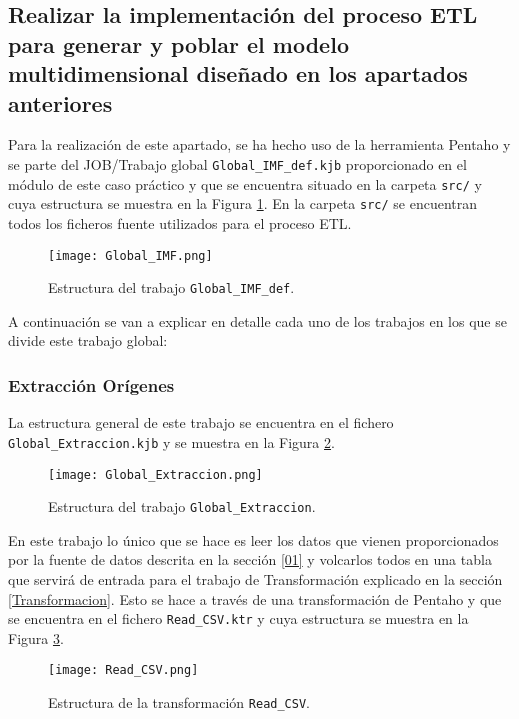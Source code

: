\medskip
\subsection{Realizar la implementación del proceso ETL para generar y poblar el modelo multidimensional diseñado en los apartados anteriores}
Para la realización de este apartado, se ha hecho uso de la herramienta Pentaho y se parte del JOB/Trabajo global \texttt{Global\_IMF\_def.kjb} proporcionado en el módulo de este caso práctico y que se encuentra situado en la carpeta \texttt{src/} y cuya estructura se muestra en la Figura \ref{Global_IMF}. En la carpeta \texttt{src/} se encuentran todos los ficheros fuente utilizados para el proceso ETL.

\begin{figure}[!th]
\texttt{[image: Global\_IMF.png]}
\centering
\caption{Estructura del trabajo \texttt{Global\_IMF\_def}.}
\label{Global_IMF}
\end{figure}

A continuación se van a explicar en detalle cada uno de los trabajos en los que se divide este trabajo global:


\medskip
\subsubsection{Extracción Orígenes}
La estructura general de este trabajo se encuentra en el fichero \texttt{Global\_Extraccion.kjb} y se muestra en la Figura \ref{Global_Extraccion}.

\begin{figure}[!th]
\texttt{[image: Global\_Extraccion.png]}
\centering
\caption{Estructura del trabajo \texttt{Global\_Extraccion}.}
\label{Global_Extraccion}
\end{figure}

En este trabajo lo único que se hace es leer los datos que vienen proporcionados por la fuente de datos descrita en la sección \ref{01} y volcarlos todos en una tabla que servirá de entrada para el trabajo de Transformación explicado en la sección \ref{Transformacion}. Esto se hace a través de una transformación de Pentaho y que se encuentra en el fichero \texttt{Read\_CSV.ktr} y cuya estructura se muestra en la Figura \ref{Read_CSV}.

\begin{figure}[!th]
\texttt{[image: Read\_CSV.png]}
\centering
\caption{Estructura de la transformación \texttt{Read\_CSV}.}
\label{Read_CSV}
\end{figure}


